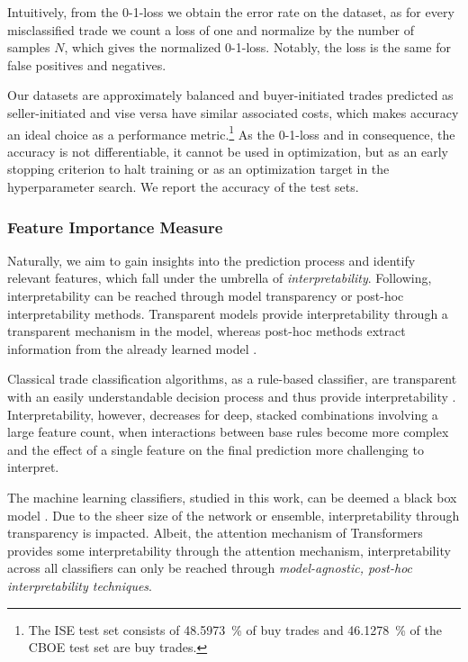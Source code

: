 Intuitively, from the 0-1-loss we obtain the error rate on the dataset, as for every misclassified trade we count a loss of one and normalize by the number of samples $N$, which gives the normalized 0-1-loss. Notably, the loss is the same for false positives and negatives.

Our datasets are approximately balanced and buyer-initiated trades predicted as seller-initiated and vise versa have similar associated costs, which makes accuracy an ideal choice as a performance metric.\footnote{The \gls{ISE} test set consists of \SI{48.5973}{\percent} of buy trades and \SI{46.1278}{\percent} of the \gls{CBOE} test set are buy trades.} As the 0-1-loss and in consequence, the accuracy is not differentiable, it cannot be used in optimization, but as an early stopping criterion to halt training or as an optimization target in the hyperparameter search. We report the accuracy of the test sets.

\subsubsection{Feature Importance
    Measure}\label{sec:feature-importance-measure}

Naturally, we aim to gain insights into the prediction process and identify relevant features, which fall under the umbrella of \emph{interpretability}.
Following, \textcite[][44--45]{liptonMythosModelInterpretability2017} interpretability can be reached through model transparency or post-hoc interpretability methods. Transparent models provide interpretability through a transparent mechanism in the model, whereas post-hoc methods extract information from the already learned model \autocite[][44--45]{liptonMythosModelInterpretability2017}.

Classical trade classification algorithms, as a rule-based classifier, are transparent with an easily understandable decision process and thus provide interpretability \autocite[][91]{barredoarrietaExplainableArtificialIntelligence2020}. Interpretability, however, decreases for deep, stacked combinations involving a large feature count, when interactions between base rules become more complex and the effect of a single feature on the final prediction more challenging to interpret.

The machine learning classifiers, studied in this work, can be deemed a black box model \autocite[][90]{barredoarrietaExplainableArtificialIntelligence2020}. Due to the sheer size of the network or ensemble, interpretability through transparency is impacted. Albeit, the attention mechanism of Transformers provides some interpretability through the attention mechanism, interpretability across all classifiers can only be reached through \emph{model-agnostic, post-hoc interpretability techniques}.

